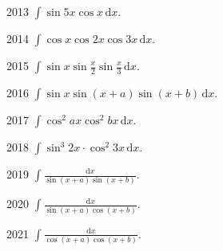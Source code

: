 
\begin{prob}[S]{2013}
$\int \sin 5x \cos x \,\mathrm{d}x$.
\end{prob}

\begin{prob}[S]{2014}
$\int \cos x \cos 2x \cos 3x \,\mathrm{d}x$.
\end{prob}

\begin{prob}[S]{2015}
$\int \sin x \sin \frac{x}{2} \sin \frac{x}{3} \,\mathrm{d}x$.
\end{prob}

\begin{prob}[S]{2016}
$\int \sin x \sin(x + a) \sin(x + b) \,\mathrm{d}x$.
\end{prob}

\begin{prob}[S]{2017}
$\int \cos^2 ax \cos^2 bx \,\mathrm{d}x$.
\end{prob}

\begin{prob}[S]{2018}
$\int \sin^3 2x \cdot \cos^2 3x \,\mathrm{d}x$.
\end{prob}


\begin{prob}[S]{2019}
$\int \frac{\mathrm{d}x}{\sin(x + a)\sin(x + b)}$.
\end{prob}

\begin{prob}[S]{2020}
$\int \frac{\mathrm{d}x}{\sin(x + a)\cos(x + b)}$.
\end{prob}

\begin{prob}[S]{2021}
$\int \frac{\mathrm{d}x}{\cos(x + a)\cos(x + b)}$.
\end{prob}

